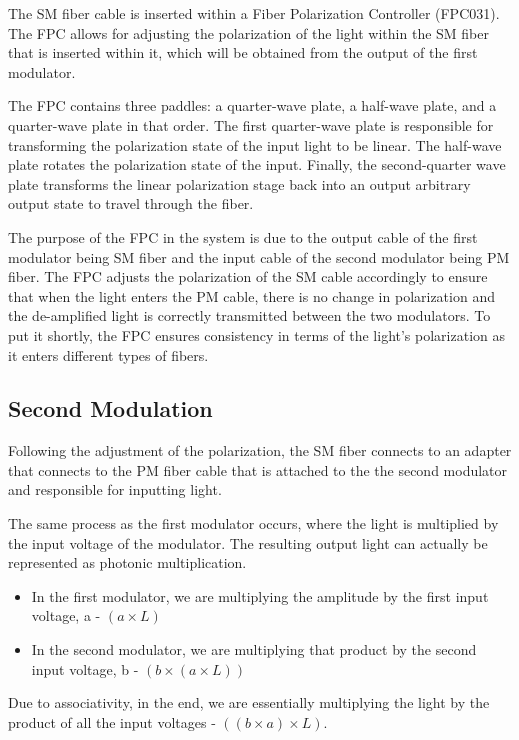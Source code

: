 \documentclass[11pt]{article}
\begin{document}
The SM fiber cable is inserted within a Fiber Polarization Controller (FPC031). The FPC allows for adjusting the polarization of the light within the SM fiber that is inserted within it, which will be obtained from the output of the first modulator. 

The FPC contains three paddles: a quarter-wave plate, a half-wave plate, and a quarter-wave plate in that order. The first quarter-wave plate is responsible for transforming the polarization state of the input light to be linear. The half-wave plate rotates the polarization state of the input. Finally, the second-quarter wave plate transforms the linear polarization stage back into an output arbitrary output state to travel through the fiber. 

The purpose of the FPC in the system is due to the output cable of the first modulator being SM fiber and the input cable of the second modulator being PM fiber. The FPC adjusts the polarization of the SM cable accordingly to ensure that when the light enters the PM cable, there is no change in polarization and the de-amplified light is correctly transmitted between the two modulators. To put it shortly, the FPC ensures consistency in terms of the light's polarization as it enters different types of fibers.

\subsection{Second Modulation}

Following the adjustment of the polarization, the SM fiber connects to an adapter that connects to the PM fiber cable that is attached to the the second modulator and responsible for inputting light.

The same process as the first modulator occurs, where the light is multiplied by the input voltage of the modulator. The resulting output light can actually be represented as photonic multiplication. 
\begin{itemize}
  \item In the first modulator, we are multiplying the amplitude by the first input voltage, a - $(a \times L)$
  \item In the second modulator, we are multiplying that product by the second input voltage, b - $(b \times (a \times L))$
\end{itemize}
  Due to associativity, in the end, we are essentially multiplying the light by the product of all the input voltages - $((b \times a) \times L)$.
\end{document}
